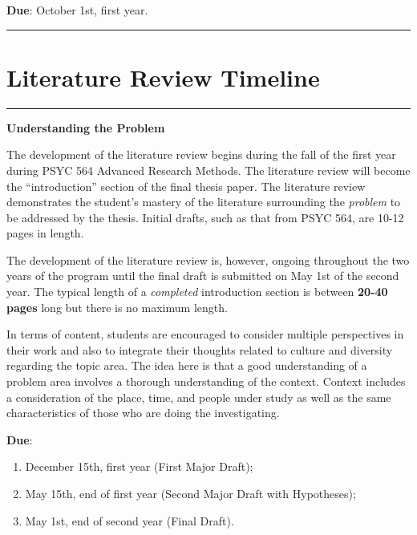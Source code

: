 \documentclass[openany]{book}
\providecommand{\tightlist}{%
  \setlength{\itemsep}{0pt}\setlength{\parskip}{0pt}}
\begin{document}
\textbf{Due}: October 1st, first year.

\begin{center}\rule{0.5\linewidth}{0.5pt}\end{center}

\hypertarget{literature-review-timeline}{%
\section{Literature Review Timeline}\label{literature-review-timeline}}

\begin{center}\rule{0.5\linewidth}{0.5pt}\end{center}

\textbf{Understanding the Problem}

The development of the literature review begins during the fall of the first year during PSYC 564 Advanced Research Methods. The literature review will become the ``introduction'' section of the final thesis paper. The literature review demonstrates the student's mastery of the literature surrounding the \emph{problem} to be addressed by the thesis. Initial drafts, such as that from PSYC 564, are 10-12 pages in length.

The development of the literature review is, however, ongoing throughout the two years of the program until the final draft is submitted on May 1st of the second year. The typical length of a \emph{completed} introduction section is between \textbf{20-40 pages} long but there is no maximum length.

In terms of content, students are encouraged to consider multiple perspectives in their work and also to integrate their thoughts related to culture and diversity regarding the topic area. The idea here is that a good understanding of a problem area involves a thorough understanding of the context. Context includes a consideration of the place, time, and people under study as well as the same characteristics of those who are doing the investigating.

\textbf{Due}:

\begin{enumerate}
\def\labelenumi{\arabic{enumi}.}
\tightlist
\item
  December 15th, first year (First Major Draft);
\item
  May 15th, end of first year (Second Major Draft with Hypotheses);
\item
  May 1st, end of second year (Final Draft).
\end{enumerate}
\end{document}
